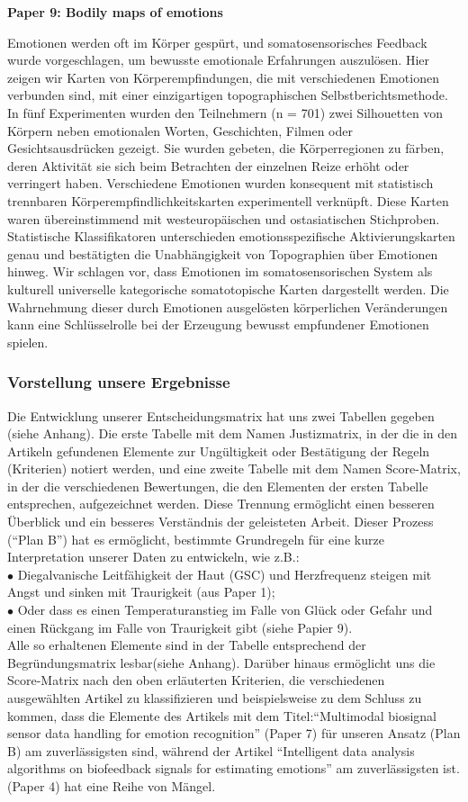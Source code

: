 \textbf{Paper 9: Bodily maps of emotions}

Emotionen werden oft im Körper gespürt, und somatosensorisches Feedback wurde vorgeschlagen, um bewusste emotionale Erfahrungen auszulösen. 
Hier zeigen wir Karten von Körperempfindungen, die mit verschiedenen Emotionen verbunden sind, mit einer einzigartigen topographischen Selbstberichtsmethode. 
In fünf Experimenten wurden den Teilnehmern (n = 701) zwei Silhouetten von Körpern neben emotionalen Worten, Geschichten, Filmen oder Gesichtsausdrücken gezeigt. Sie wurden gebeten, die Körperregionen zu färben, deren Aktivität sie sich beim Betrachten der einzelnen Reize erhöht oder verringert haben. 
Verschiedene Emotionen wurden konsequent mit statistisch trennbaren Körperempfindlichkeitskarten experimentell verknüpft. 
Diese Karten waren übereinstimmend mit westeuropäischen und ostasiatischen Stichproben. Statistische Klassifikatoren unterschieden emotionsspezifische Aktivierungskarten genau und bestätigten die Unabhängigkeit von Topographien über Emotionen hinweg. Wir schlagen vor, dass Emotionen im somatosensorischen System als kulturell universelle kategorische somatotopische Karten dargestellt werden. Die Wahrnehmung dieser durch Emotionen ausgelösten körperlichen Veränderungen kann eine Schlüsselrolle bei der Erzeugung bewusst empfundener Emotionen spielen. \\


\subsubsection{Vorstellung unsere Ergebnisse}

Die Entwicklung unserer Entscheidungsmatrix hat uns zwei Tabellen gegeben (siehe Anhang). 
Die erste Tabelle mit dem Namen Justizmatrix, in der die in den Artikeln gefundenen Elemente zur Ungültigkeit oder Bestätigung der Regeln (Kriterien) notiert werden, und eine zweite Tabelle mit dem Namen Score-Matrix, in der die verschiedenen Bewertungen, die den Elementen der ersten Tabelle entsprechen, aufgezeichnet werden. 
Diese Trennung ermöglicht einen besseren Überblick und ein besseres Verständnis der geleisteten Arbeit. 
Dieser Prozess (``Plan B'') hat es ermöglicht, bestimmte Grundregeln für eine kurze Interpretation unserer Daten zu entwickeln, wie z.B.: \\
$\bullet$ Diegalvanische Leitfähigkeit der Haut (GSC) und Herzfrequenz steigen mit Angst und sinken mit Traurigkeit (aus Paper 1); \\
$\bullet$ Oder dass es einen Temperaturanstieg im Falle von Glück oder Gefahr und einen Rückgang im Falle von Traurigkeit gibt (siehe Papier 9).\\
Alle so erhaltenen Elemente sind in der Tabelle entsprechend der Begründungsmatrix lesbar(siehe Anhang).
Darüber hinaus ermöglicht uns die Score-Matrix nach den oben erläuterten Kriterien, die verschiedenen ausgewählten Artikel zu klassifizieren und beispielsweise zu dem Schluss zu kommen, dass die Elemente des Artikels mit dem Titel:``Multimodal biosignal sensor data handling for emotion recognition'' (Paper 7) für unseren Ansatz (Plan B) am zuverlässigsten sind, während der Artikel ``Intelligent data analysis algorithms on biofeedback signals for estimating emotions'' am zuverlässigsten ist. (Paper 4) hat eine Reihe von Mängel.